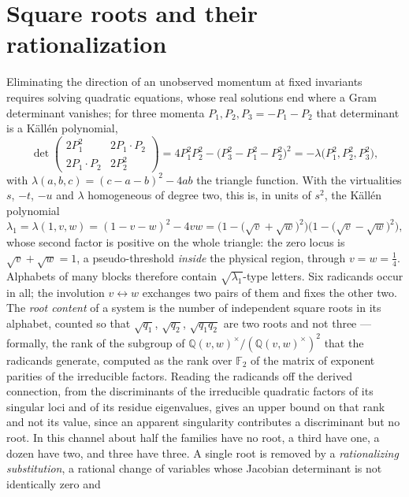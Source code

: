\documentclass[11pt]{article}
\newcommand{\Q}{\mathbb{Q}}
\begin{document}
\section{Square roots and their rationalization}
Eliminating the direction of an unobserved momentum at fixed
invariants requires solving quadratic equations, whose real solutions
end where a Gram determinant vanishes; for three momenta
$P_1, P_2, P_3 = -P_1-P_2$ that determinant is a K\"all\'en
polynomial,
\begin{equation}
  \det\begin{pmatrix}
    2P_1^2 & 2P_1\!\cdot\!P_2\\ 2P_1\!\cdot\!P_2 & 2P_2^2
  \end{pmatrix}
  = 4P_1^2P_2^2 - \big(P_3^2-P_1^2-P_2^2\big)^2
  = -\lambda\big(P_1^2,P_2^2,P_3^2\big) ,
\end{equation}
with $\lambda(a,b,c) = (c-a-b)^2-4ab$ the triangle function.
With the virtualities $s$, $-t$, $-u$ and $\lambda$ homogeneous of
degree two, this is, in units of $s^2$, the K\"all\'en polynomial
\begin{equation}
  \lambda_1 = \lambda(1,v,w) = (1-v-w)^2 - 4vw
  = \Big(1-\big(\sqrt v + \sqrt w\big)^2\Big)
    \Big(1-\big(\sqrt v - \sqrt w\big)^2\Big) ,
\end{equation}
whose second factor is positive on the whole triangle: the zero locus
is $\sqrt v + \sqrt w = 1$, a pseudo-threshold \emph{inside} the
physical region, through $v = w = \tfrac14$.  Alphabets of many
blocks therefore contain $\sqrt{\lambda_1}$-type letters.  Six
radicands occur in all; the involution $v \leftrightarrow w$
exchanges two pairs of them and fixes the other two.  The
\emph{root content} of a system is the number of independent square
roots in its alphabet, counted so that $\sqrt{q_1}$, $\sqrt{q_2}$,
$\sqrt{q_1 q_2}$ are two roots and not three --- formally, the rank
of the subgroup of $\Q(v,w)^\times/(\Q(v,w)^\times)^2$ that the
radicands generate, computed as the rank over $\mathbb{F}_2$ of the
matrix of exponent parities of the irreducible factors.  Reading the
radicands off the derived connection, from the discriminants of the
irreducible quadratic factors of its singular loci and of its residue
eigenvalues, gives an upper bound on that rank and not its value,
since an apparent singularity contributes a discriminant but no root.
In this channel about half the families have no root, a third have
one, a dozen have two, and three have three.  A single root is
removed by a \emph{rationalizing substitution}, a rational change of
variables whose Jacobian determinant is not identically zero and
\end{document}

